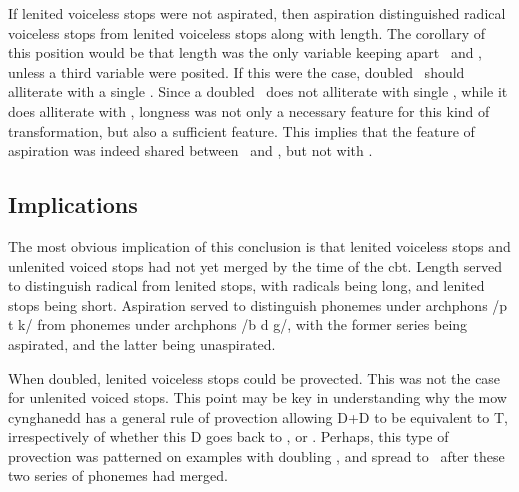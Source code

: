 If lenited voiceless stops were not aspirated, then aspiration distinguished radical voiceless stops from lenited voiceless stops along with length. The corollary of this position would be that length was the only variable keeping apart \lT\ and \xD, unless a third variable were posited. If this were the case, doubled \lT\ should alliterate with a single \xD. Since a doubled \lT\ does not alliterate with single \xD, while it does alliterate with \xT, longness was not only a necessary feature for this kind of transformation, but also a  sufficient feature. This implies that the feature of aspiration was indeed shared between \lT\ and \xT, but not with \xD.

\subsection{Implications}
The most obvious implication of this conclusion is that lenited voiceless stops and unlenited voiced stops had not yet merged by the time of the \gls{cbt}. Length served to distinguish radical from lenited stops, with radicals being long, and lenited stops being short. Aspiration served to distinguish phonemes under \gls{archphon}s /p t k/ from phonemes under \gls{archphon}s /b d g/, with the former series being aspirated, and the latter being unaspirated.

When doubled, lenited voiceless stops could be provected. This was not the case for unlenited voiced stops. This point may be key in understanding why the \gls{mow} cynghanedd has a general rule of provection allowing \gls{D}+\gls{D} to be equivalent to \gls{T}, irrespectively of whether this \gls{D} goes back to \lT, or \xD. Perhaps, this type of provection was patterned on examples with doubling \lT, and spread to \xD\ after these two series of phonemes had merged.